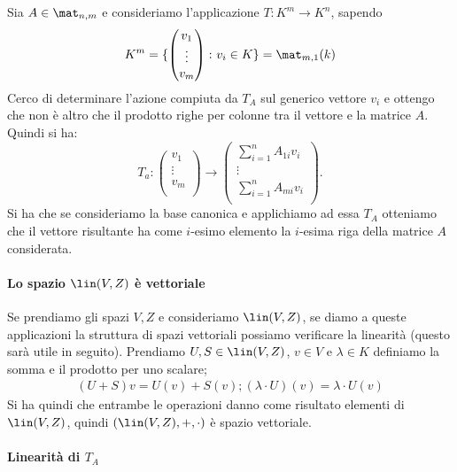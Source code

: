 Sia $A\in \mat_{n,m}$ e consideriamo l'applicazione $T\colon K^m\to K^n$, sapendo
\begin{equation*}
	K^m = \{
	\begin{pmatrix}
		v_1\\
		\vdots\\
		v_m\\
	\end{pmatrix}
	\colon v_i\in K \} = \mat_{m,1}(k)
\end{equation*}
Cerco di determinare l'azione compiuta da $T_A$ sul generico vettore $v_i$ e ottengo che non è altro che il prodotto righe per colonne tra il vettore e la matrice $A$.
Quindi si ha:
\begin{equation*}
	T_a\colon
	\begin{pmatrix}
		v_1\\
		\vdots\\
		v_m\\
	\end{pmatrix}
	\to
	\begin{pmatrix}
		\sum_{i=1}^n A_{1i} v_i\\
		\vdots\\
		\sum_{i=1}^n A_{mi} v_i\\
	\end{pmatrix}.
\end{equation*}
Si  ha che se consideriamo la base canonica e applichiamo ad essa $T_A$ otteniamo che il vettore risultante ha come $i$-esimo elemento la $i$-esima riga della matrice $A$ considerata.
\paragraph{Lo spazio $\lin(V,Z)$ è vettoriale}

Se prendiamo gli spazi $V,Z$ e consideriamo $\lin(V,Z)$, se diamo a queste applicazioni la struttura di spazi vettoriali possiamo verificare la linearità (questo sarà utile in seguito).
Prendiamo $U,S\in\lin(V,Z)$, $  v\in V$ e $\lambda\in K$ definiamo la somma e il prodotto per uno scalare;
\begin{equation*}
	\begin{gathered}
		(U+S)  v = U(  v) + S(  v);
		(\lambda\cdot U)(  v) = \lambda\cdot U(  v)
	\end{gathered}
\end{equation*}
Si ha quindi che entrambe le operazioni danno come risultato elementi di $\lin(V,Z)$, quindi $(\lin(V,Z),+,\cdot)$ è spazio vettoriale. 
\paragraph{Linearità di $T_A$}

